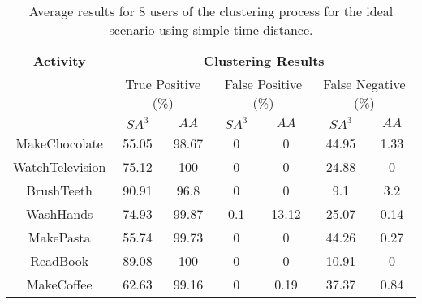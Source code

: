 \begin{table}[htbp]\scriptsize
    \begin{center}    
        \begin{tabular}{ccccccc}
            \hline            
            \textbf{Activity} & \multicolumn{6}{c}{\textbf{Clustering Results}} \\
             & \multicolumn{2}{c}{True Positive (\%)} & \multicolumn{2}{c}{False Positive (\%)} & \multicolumn{2}{c}{False Negative (\%)} \\
             & $SA^3$ & $AA$ & $SA^3$ & $AA$ & $SA^3$ & $AA$ \\
            \hline
            MakeChocolate   & 55.05 & 98.67 & 0    & 0    & 44.95 & 1.33 \\
	    WatchTelevision & 75.12 & 100   & 0    & 0    & 24.88 & 0    \\
	    BrushTeeth      & 90.91 & 96.8  & 0    & 0    & 9.1   & 3.2 \\
	    WashHands       & 74.93 & 99.87 & 0.1  & 13.12  & 25.07 & 0.14 \\
	    MakePasta       & 55.74 & 99.73 & 0    & 0    & 44.26 & 0.27 \\
	    ReadBook        & 89.08 & 100   & 0    & 0    & 10.91 & 0 \\
	    MakeCoffee      & 62.63 & 99.16 & 0    & 0.19 & 37.37 & 0.84 \\
            \hline
        \end{tabular}
        \caption{Average results for 8 users of the clustering process for the ideal scenario using simple time distance.}
        \label{tab-r-ideal-t0}
        \end{center}
\end{table}
        
